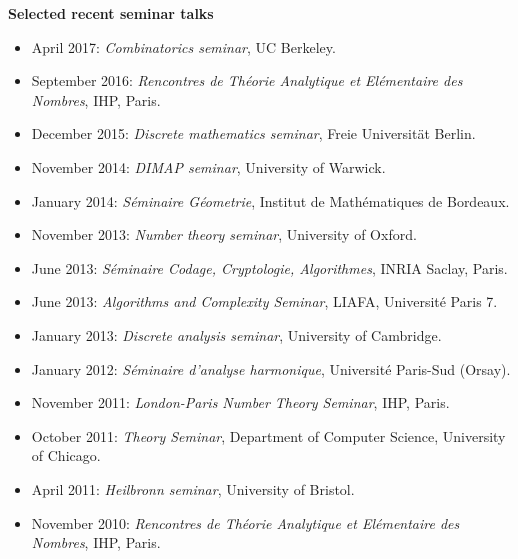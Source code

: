 \documentclass[11pt]{article}
\newenvironment{mitemize}{
\begin{itemize}
  \setlength{\itemsep}{1pt}
  \setlength{\parskip}{0pt}
  \setlength{\parsep}{0pt}
}{\end{itemize}}
\begin{document}
\textbf{Selected recent seminar talks}
\begin{mitemize}
\item April 2017: \emph{Combinatorics seminar}, UC Berkeley.
\item September 2016:  \emph{Rencontres de Th\'eorie Analytique et El\'ementaire des Nombres}, IHP, Paris. 
\item December 2015: \emph{Discrete mathematics seminar}, Freie Universit\"at Berlin.
\item November 2014: \emph{DIMAP seminar}, University of Warwick. 
\item January 2014: \emph{S\'eminaire G\'eometrie}, Institut de Math\'ematiques de Bordeaux.
\item November 2013: \emph{Number theory seminar}, University of Oxford.
\item June 2013: \emph{S\'eminaire Codage, Cryptologie, Algorithmes}, INRIA Saclay, Paris.
\item June 2013: \emph{Algorithms and Complexity Seminar}, LIAFA, Universit\'e Paris 7.
\item January 2013: \emph{Discrete analysis seminar}, University of Cambridge.
\item January 2012: \emph{S\'eminaire d'analyse harmonique}, Universit\'e Paris-Sud (Orsay).
\item November 2011: \emph{London-Paris Number Theory Seminar}, IHP, Paris.
\item October 2011: \emph{Theory Seminar}, Department of Computer Science, University of Chicago.
\item April 2011: \emph{Heilbronn seminar}, University of Bristol. 
\item November 2010: \emph{Rencontres de Th\'eorie Analytique et El\'ementaire des Nombres}, IHP, Paris. 

\end{mitemize}
\end{document}
